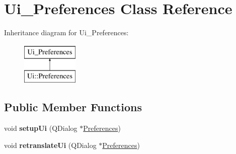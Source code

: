\hypertarget{classUi__Preferences}{
\section{Ui\_\-Preferences Class Reference}
\label{classUi__Preferences}
}
Inheritance diagram for Ui\_\-Preferences:\begin{figure}[H]
\begin{center}
\leavevmode
\includegraphics[height=2.000000cm]{classUi__Preferences}
\end{center}
\end{figure}
\subsection*{Public Member Functions}
\begin{DoxyCompactItemize}
\item 
\hypertarget{classUi__Preferences_a2c535ca36a3133132a7c858a4972df85}{
void {\bfseries setupUi} (QDialog $\ast$\hyperlink{classPreferences}{Preferences})}
\label{classUi__Preferences_a2c535ca36a3133132a7c858a4972df85}

\item 
\hypertarget{classUi__Preferences_ab767b13e8a1f7e884935d112f2e17ab2}{
void {\bfseries retranslateUi} (QDialog $\ast$\hyperlink{classPreferences}{Preferences})}
\label{classUi__Preferences_ab767b13e8a1f7e884935d112f2e17ab2}

\end{DoxyCompactItemize}
